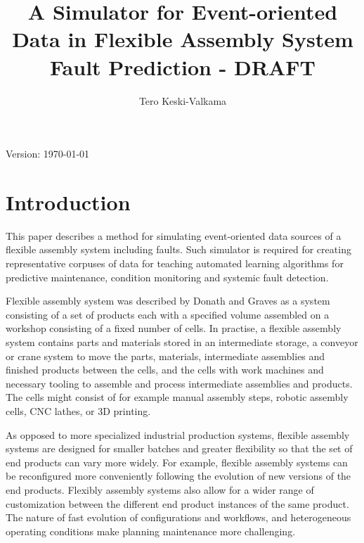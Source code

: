 \documentclass[journal]{IEEEtran}
\title{A Simulator for Event-oriented Data in Flexible Assembly System Fault Prediction - DRAFT}
\author{Tero Keski-Valkama}
\begin{document}
\maketitle
Version: \today

\begin{abstract}

\end{abstract}

\begin{IEEEkeywords}
\end{IEEEkeywords}

\section{Introduction}
This paper describes a method for simulating event-oriented data sources of a flexible assembly system including faults. Such simulator is required for creating representative corpuses
of data for teaching automated learning algorithms for predictive maintenance, condition monitoring and systemic fault detection.

Flexible assembly system was described by Donath and Graves \cite{donath1988flexible} as a system consisting of a set of products each with a specified volume
assembled on a workshop consisting of a fixed number of cells. In practise, a flexible assembly system contains parts and materials stored in an intermediate storage,
a conveyor or crane system to move the parts, materials, intermediate assemblies and finished products between the cells, and the cells with work machines and necessary tooling
to assemble and process intermediate assemblies and products. The cells might consist of for example manual assembly steps, robotic assembly cells, CNC lathes, or 3D printing.

As opposed to more specialized industrial production systems, flexible assembly systems are designed for smaller batches and greater flexibility so that the set of end products can vary more widely.
For example, flexible assembly systems can be reconfigured more conveniently following the evolution of new versions of the end products. Flexibly assembly systems also allow for a wider range
of customization between the different end product instances of the same product. The nature of fast evolution of configurations and workflows, and heterogeneous operating conditions make
planning maintenance more challenging.
\end{document}
